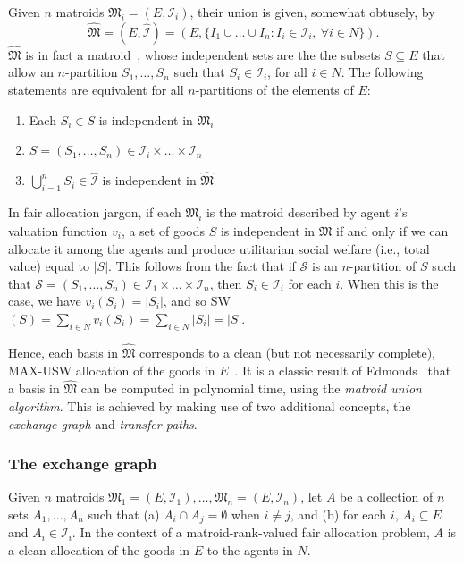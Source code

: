 Given $n$ matroids $\mathfrak{M}_i = (E, \mathcal{I}_i)$, their union is given, somewhat obtusely, by $$\widehat{\mathfrak{M}} = (E, \widehat{\mathcal{I}}) = (E, \{ I_1\cup\ldots\cup I_n : I_i\in\mathcal{I}_i,\ \forall i\in N \}).$$ 
$\widehat{\mathfrak{M}}$ is in fact a matroid~\cite[Ch. 42]{schrijver-2003}, whose independent sets are the the subsets $S\subseteq E$ that allow an $n$-partition $S_1,\ldots,S_n$ such that $S_i\in\mathcal{I}_i$, for all $i\in N$. The following statements are equivalent for all $n$-partitions of the elements of $E$:
\begin{enumerate}
  \item Each $S_i\in S$ is independent in $\mathfrak{M}_i$
  \item $S=(S_1,\dots,S_n)\in\mathcal{I}_i\times\dots\times\mathcal{I}_n$
  \item $\bigcup_{i=1}^n S_i \in \widehat{\mathcal{I}}$ is independent in $\widehat{\mathfrak{M}}$
\end{enumerate}

In fair allocation jargon, if each $\mathfrak{M}_i$ is the matroid described by agent $i$'s valuation function $v_i$, a set of goods $S$ is independent in $\widehat{\mathfrak{M}}$ if and only if we can allocate it among the agents and produce utilitarian social welfare (i.e., total value) equal to $|S|$. This follows from the fact that if $\mathcal{S}$ is an $n$-partition of $S$ such that $\mathcal{S} = (S_1,\dots,S_n)\in\mathcal{I}_1\times\dots\times\mathcal{I}_n$, then $S_i\in\mathcal{I}_i$ for each $i$. When this is the case, we have $v_i(S_i) = |S_i|$, and so SW$(S) = \sum_{i\in N}v_i(S_i) = \sum_{i\in N}|S_i| = |S|$.

Hence, each basis in $\widehat{\mathfrak{M}}$ corresponds to a clean (but not necessarily complete), MAX-USW allocation of the goods in $E$~\cite{barman2021existence}. It is a classic result of Edmonds~\cite{Edmonds2009} that a basis in $\widehat{\mathfrak{M}}$ can be computed in polynomial time, using the \textit{matroid union algorithm}. This is achieved by making use of two additional concepts, the \textit{exchange graph} and \textit{transfer paths}. 

\subsubsection*{The exchange graph}
Given $n$ matroids $\mathfrak{M}_1 = (E, \mathcal{I}_1),\ldots,\mathfrak{M}_n = (E,\mathcal{I}_n)$, let $A$ be a collection of $n$ sets $A_1,\dots,A_n$ such that (a) $A_i\cap A_j = \emptyset$ when $i\neq j$, and (b) for each $i$, $A_i\subseteq E$ and $A_i\in\mathcal{I}_i$. In the context of a matroid-rank-valued fair allocation problem, $A$ is a clean allocation of the goods in $E$ to the agents in $N$.

